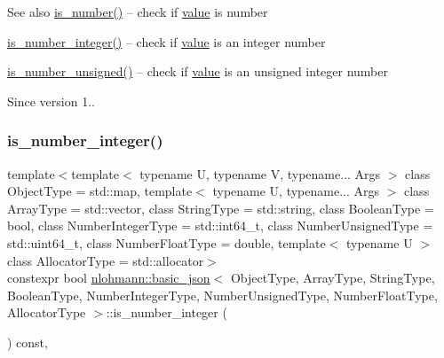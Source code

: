 \begin{DoxySeeAlso}{See also}
\hyperlink{classnlohmann_1_1basic__json_a957eb9594c7f0ca93212c30f3a400873}{is\+\_\+number()} -- check if \hyperlink{classnlohmann_1_1basic__json_a407e73a037e6e3067ef7aa2c25a79f39}{value} is number 

\hyperlink{classnlohmann_1_1basic__json_a435c93d06ef28f8003c31f62ffe4aed1}{is\+\_\+number\+\_\+integer()} -- check if \hyperlink{classnlohmann_1_1basic__json_a407e73a037e6e3067ef7aa2c25a79f39}{value} is an integer number 

\hyperlink{classnlohmann_1_1basic__json_aa388dc101bc285a98122a38fd2e3a9db}{is\+\_\+number\+\_\+unsigned()} -- check if \hyperlink{classnlohmann_1_1basic__json_a407e73a037e6e3067ef7aa2c25a79f39}{value} is an unsigned integer number
\end{DoxySeeAlso}
\begin{DoxySince}{Since}
version 1.. 
\end{DoxySince}
\hypertarget{classnlohmann_1_1basic__json_a435c93d06ef28f8003c31f62ffe4aed1}{}\label{classnlohmann_1_1basic__json_a435c93d06ef28f8003c31f62ffe4aed1} 
\subsubsection{\texorpdfstring{is\+\_\+number\+\_\+integer()}{is\_number\_integer()}}
{\footnotesize\ttfamily template$<$template$<$ typename U, typename V, typename... Args $>$ class Object\+Type = std\+::map, template$<$ typename U, typename... Args $>$ class Array\+Type = std\+::vector, class String\+Type  = std\+::string, class Boolean\+Type  = bool, class Number\+Integer\+Type  = std\+::int64\+\_\+t, class Number\+Unsigned\+Type  = std\+::uint64\+\_\+t, class Number\+Float\+Type  = double, template$<$ typename U $>$ class Allocator\+Type = std\+::allocator$>$ \\
constexpr bool \hyperlink{classnlohmann_1_1basic__json}{nlohmann\+::basic\+\_\+json}$<$ Object\+Type, Array\+Type, String\+Type, Boolean\+Type, Number\+Integer\+Type, Number\+Unsigned\+Type, Number\+Float\+Type, Allocator\+Type $>$\+::is\+\_\+number\+\_\+integer (\begin{DoxyParamCaption}{ }\end{DoxyParamCaption}) const\hspace{0.3cm}{\ttfamily [inline]}, {\ttfamily [noexcept]}}




